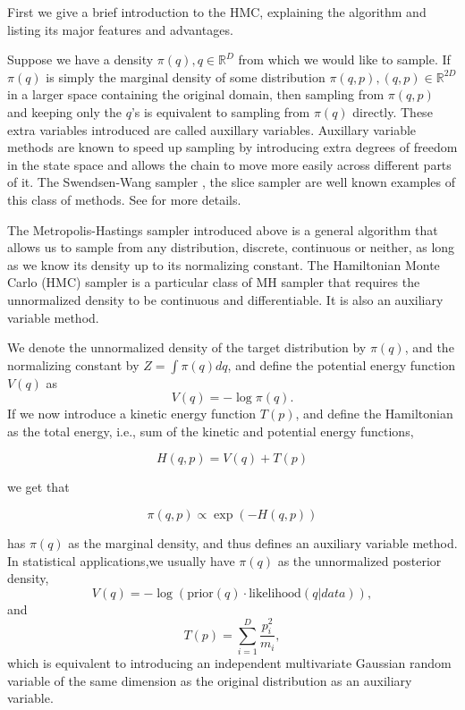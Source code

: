 \documentclass[12pt]{report}
\begin{document}
First we give a brief introduction to the HMC, explaining the algorithm and listing its major features and advantages. 

Suppose we have a density $\pi(q),q \in \mathbb{R}^D$ from which we would like to
sample. If $\pi(q)$ is simply the marginal density of some distribution $\pi(q,p),
(q,p) \in \mathbb{R}^{2D}$ in a larger space containing the original domain, then sampling from $\pi(q,p)$ and keeping only the $q$'s is equivalent to sampling from $\pi(q)$ directly. These extra variables introduced are called auxillary variables. Auxillary variable methods are known to speed up sampling by introducing extra degrees of freedom in the state space and allows the chain to move more easily across different parts of it. The Swendsen-Wang sampler \cite{wang1990cluster}, the slice sampler\cite{wang1990cluster} are well known examples of this class of methods. See \cite{liang2011advanced,liu2008monte} for more details.

The Metropolis-Hastings sampler introduced above is a general algorithm that allows us to sample from any distribution, discrete, continuous or neither, as long as we know its density up to its normalizing constant. The Hamiltonian Monte Carlo (HMC) sampler is a particular class of MH sampler that requires the unnormalized density to be continuous and differentiable. It is also an auxiliary variable method. 


We denote the unnormalized density of the target distribution by $\pi(q)$, and the normalizing constant by $Z = \int\pi(q)dq $, and define the potential energy function $V(q)$ as 
\[ V(q) =  -\log \pi(q) .\]
If we now introduce a kinetic energy function $T(p)$, and define
the Hamiltonian as the total energy, i.e., sum of the kinetic and potential energy functions, 

\[ H(q,p) = V(q) + T(p) \]

we get that 

\[\pi(q,p) \propto  \exp(-H(q,p)) \]

has $\pi(q)$ as the marginal density, and thus defines an auxiliary variable method. In statistical applications,we usually have $\pi(q)$ as the unnormalized posterior
density, 
\[V(q) = -\log(\text{prior}(q) \cdot \text{likelihood}(q|data) ), \]
and 
\[T(p) = \sum_{i=1}^D \frac{p_i^2}{m_i}, \]
which is equivalent to introducing an independent multivariate Gaussian random variable of
the same dimension as the original distribution as an auxiliary variable. 
\end{document}
